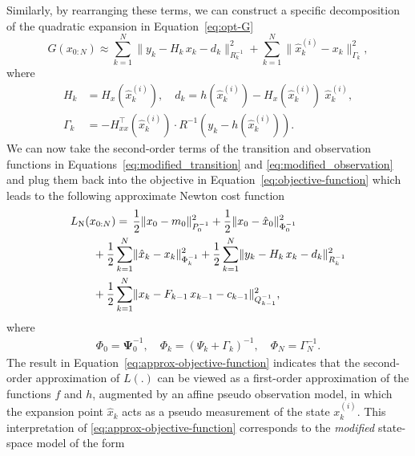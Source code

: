 \documentclass[dissertation,math,vertlayout,pdfa,colorlinks,nologo]{aaltoseries}
\begin{document}
Similarly, by rearranging these terms, we can construct a specific decomposition of the quadratic expansion in Equation~\eqref{eq:opt-G}
\begin{equation} \label{eq:modified_observation}
    G(x_{0:N}) \! \approx \sum_{k=1}^{N} \lVert y_{k} - H_{k} \, x_{k} - d_{k} \rVert^{2}_{R_k^{-1}} + \! \sum_{k=1}^{N} \lVert \hat{x}^{(i)}_{k} - x_{k} \rVert^{2}_{\Gamma_{k}},
\end{equation}
where
\begin{equation} \label{eq:approx-params-G}
    \begin{split}
        H_{k} &= H_{x}(\hat{x}^{(i)}_{k}), \quad d_k = h(\hat{x}^{(i)}_{k}) - H_x(\hat{x}^{(i)}_{k}) \, \, \hat{x}^{(i)}_{k}, \\
        \Gamma_{k} &= - H_{x x}^{\top}(\hat{x}^{(i)}_{k}) \cdot R^{-1} (y_{k} - h(\hat{x}^{(i)}_{k})).
    \end{split}
\end{equation}
We can now take the second-order terms of the transition and observation functions in Equations~\eqref{eq:modified_transition} and \eqref{eq:modified_observation} and plug them back into the objective in Equation~\eqref{eq:objective-function} which leads to the following approximate Newton cost function 
\begin{align} 
    \label{eq:approx-objective-function}
    & L_{\text{N}}(x_{0:N}) = \,
    \frac{1}{2} \lVert x_{0} - m_{0} \rVert^{2}_{{P}_{0}^{-1}} + \frac{1}{2} \lVert x_{0} - \hat{x}_{0} \rVert^{2}_{{\Phi}_{0}^{-1}} \notag \\
    & \qquad + \frac{1}{2} \sum_{k=1}^{N} \lVert \hat{x}_{k} - x_{k} \rVert^{2}_{\Phi_{k}^{-1}}
    + \frac{1}{2} \sum_{k=1}^{N} \lVert y_{k} - H_{k} \, x_{k} - d_{k} \rVert^{2}_{R_{k}^{-1}} \notag \\
    & \qquad + \frac{1}{2} \sum_{k=1}^{N} \lVert x_{k}- F_{k-1} \, x_{k-1} - c_{k-1} \rVert^{2}_{Q_{k-1}^{-1}},
\end{align}
where 
\begin{equation}
    \begin{split}
        \Phi_{0} = \mathbf{\Psi}_{0}^{-1}, \quad \Phi_{k} = (\Psi_{k} + \Gamma_{k})^{-1}, \quad \Phi_{N} = \Gamma_{N}^{-1}.
    \end{split}
\end{equation}
The result in Equation~\eqref{eq:approx-objective-function} indicates that the second-order approximation of $L(.)$ can be viewed as a first-order approximation of the functions $f$ and $h$, augmented by an affine pseudo observation model, in which the expansion point $\hat{x}_{k}$ acts as a pseudo measurement of the state $x_{k}^{(i)}$. This interpretation of \eqref{eq:approx-objective-function} corresponds to the \emph{modified} state-space model of the form 
\end{document}
